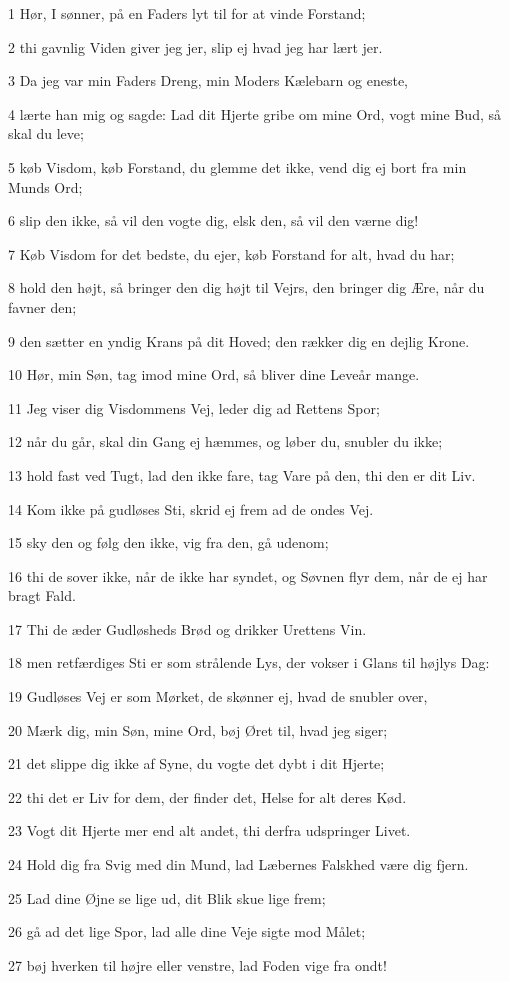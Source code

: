\par 1 Hør, I sønner, på en Faders lyt til for at vinde Forstand;
\par 2 thi gavnlig Viden giver jeg jer, slip ej hvad jeg har lært jer.
\par 3 Da jeg var min Faders Dreng, min Moders Kælebarn og eneste,
\par 4 lærte han mig og sagde: Lad dit Hjerte gribe om mine Ord, vogt mine Bud, så skal du leve;
\par 5 køb Visdom, køb Forstand, du glemme det ikke, vend dig ej bort fra min Munds Ord;
\par 6 slip den ikke, så vil den vogte dig, elsk den, så vil den værne dig!
\par 7 Køb Visdom for det bedste, du ejer, køb Forstand for alt, hvad du har;
\par 8 hold den højt, så bringer den dig højt til Vejrs, den bringer dig Ære, når du favner den;
\par 9 den sætter en yndig Krans på dit Hoved; den rækker dig en dejlig Krone.
\par 10 Hør, min Søn, tag imod mine Ord, så bliver dine Leveår mange.
\par 11 Jeg viser dig Visdommens Vej, leder dig ad Rettens Spor;
\par 12 når du går, skal din Gang ej hæmmes, og løber du, snubler du ikke;
\par 13 hold fast ved Tugt, lad den ikke fare, tag Vare på den, thi den er dit Liv.
\par 14 Kom ikke på gudløses Sti, skrid ej frem ad de ondes Vej.
\par 15 sky den og følg den ikke, vig fra den, gå udenom;
\par 16 thi de sover ikke, når de ikke har syndet, og Søvnen flyr dem, når de ej har bragt Fald.
\par 17 Thi de æder Gudløsheds Brød og drikker Urettens Vin.
\par 18 men retfærdiges Sti er som strålende Lys, der vokser i Glans til højlys Dag:
\par 19 Gudløses Vej er som Mørket, de skønner ej, hvad de snubler over,
\par 20 Mærk dig, min Søn, mine Ord, bøj Øret til, hvad jeg siger;
\par 21 det slippe dig ikke af Syne, du vogte det dybt i dit Hjerte;
\par 22 thi det er Liv for dem, der finder det, Helse for alt deres Kød.
\par 23 Vogt dit Hjerte mer end alt andet, thi derfra udspringer Livet.
\par 24 Hold dig fra Svig med din Mund, lad Læbernes Falskhed være dig fjern.
\par 25 Lad dine Øjne se lige ud, dit Blik skue lige frem;
\par 26 gå ad det lige Spor, lad alle dine Veje sigte mod Målet;
\par 27 bøj hverken til højre eller venstre, lad Foden vige fra ondt!

